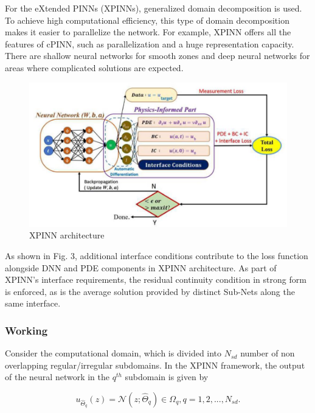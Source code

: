 \documentclass[conference,compsoc]{IEEEtran}
\begin{document}
For the eXtended PINNs (XPINNs), generalized domain decomposition is used\cite{jagtap2020extended}. To achieve high computational efficiency, this type of domain decomposition makes it easier to parallelize the network\cite{jagtap2020conservative}\cite{jagtap2020extended}. For example, XPINN offers all the features of cPINN, such as parallelization and a huge representation capacity. There are shallow neural networks for smooth zones and deep neural networks for areas where complicated solutions are expected\cite{jagtap2020extended}.

\begin{figure}[h]
    \centering
    \includegraphics[scale = 0.8]{figures/xpinn.JPG}
    \caption{XPINN architecture\cite{jagtap2020extended}}
\end{figure}

As shown in Fig. 3, additional interface conditions contribute to the loss function alongside DNN and PDE components in XPINN architecture. As part of XPINN's interface requirements, the residual continuity condition in strong form is enforced, as is the average solution provided by distinct Sub-Nets along the same interface.

\subsubsection{Working} 
Consider the computational domain, which is divided into $N_{sd}$ number of non overlapping
regular/irregular subdomains\cite{jagtap2020extended}. In the XPINN framework, the output of the
neural network in the $q^{th}$ subdomain is given by

\begin{equation}
    u_{\hat{\Theta}_q}(z) = \mathcal{N}(z;\hat{\Theta}_q) \in \Omega_q, q=1,2,...,N_{sd}.
\end{equation}
\end{document}
